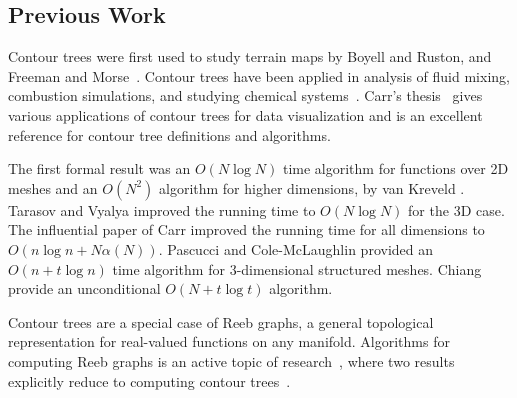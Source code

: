 \subsection{Previous Work}

Contour trees were first used to study terrain maps by Boyell and Ruston, and Freeman and Morse~\cite{BoRu63,FrMo67}.
Contour trees have been applied in analysis of fluid mixing, combustion simulations,
and studying chemical systems~\cite{LaBe+06,BrWe+10,BeWe+11,BrWe+11,MaGr+11}. Carr's thesis~\cite{c-tmi-04} gives various
applications of contour trees for data visualization and is an excellent reference for contour tree definitions and algorithms.

The first formal result was an $O(N\log N)$ time algorithm for functions over 2D 
meshes and an $O(N^2)$ algorithm for higher dimensions, by van Kreveld \etal \cite{kobps-ctsssit-97}. 
Tarasov and Vyalya \cite{tv-cct-98} improved the running time to $O(N\log N)$ for the 3D case.
The influential paper of Carr \etal \cite{csa-cctad-00} improved the running time for all dimensions to $O(n\log n + N\alpha(N))$.
Pascucci and Cole-McLaughlin \cite{pc-ectls-02} provided an $O(n+t\log n)$ time algorithm for 
$3$-dimensional structured meshes. Chiang \etal \cite{cllr-sooscctmp-05} provide an unconditional $O(N+t\log t)$ algorithm.

Contour trees are a special case of Reeb graphs, a general topological representation for real-valued functions
on any manifold. Algorithms for computing Reeb graphs
is an active topic of research~\cite{sk-crgacs-91,cehnp-lrbm-03,PaScBr07,DoNa09,HaWaWe10,Pa12}, where
two results explicitly reduce to computing contour trees~\cite{TiGySi09,DoNa13}.



